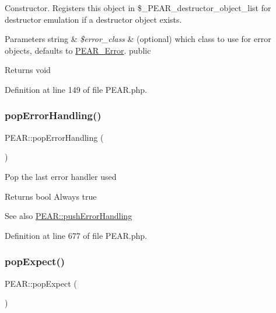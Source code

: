 Constructor. Registers this object in \$\+\_\+\+P\+E\+A\+R\+\_\+destructor\+\_\+object\+\_\+list for destructor emulation if a destructor object exists.


\begin{DoxyParams}[1]{Parameters}
string & {\em \$error\+\_\+class} & (optional) which class to use for error objects, defaults to \hyperlink{classPEAR__Error}{P\+E\+A\+R\+\_\+\+Error}.  public \\
\hline
\end{DoxyParams}
\begin{DoxyReturn}{Returns}
void 
\end{DoxyReturn}


Definition at line 149 of file P\+E\+A\+R.\+php.

\mbox{\label{classPEAR_adc1bc0e4afb5652ad5c42bbd82b7a353}} 
\subsubsection{\texorpdfstring{pop\+Error\+Handling()}{popErrorHandling()}}
{\footnotesize\ttfamily P\+E\+A\+R\+::pop\+Error\+Handling (\begin{DoxyParamCaption}{ }\end{DoxyParamCaption})}

Pop the last error handler used

\begin{DoxyReturn}{Returns}
bool Always true
\end{DoxyReturn}
\begin{DoxySeeAlso}{See also}
\hyperlink{classPEAR_a44c791bbf9e490da1b053dcd075fd285}{P\+E\+A\+R\+::push\+Error\+Handling} 
\end{DoxySeeAlso}


Definition at line 677 of file P\+E\+A\+R.\+php.

\mbox{\label{classPEAR_a3ea2df43e39214a29f77f8773a5afcc4}} 
\subsubsection{\texorpdfstring{pop\+Expect()}{popExpect()}}
{\footnotesize\ttfamily P\+E\+A\+R\+::pop\+Expect (\begin{DoxyParamCaption}{ }\end{DoxyParamCaption})}

